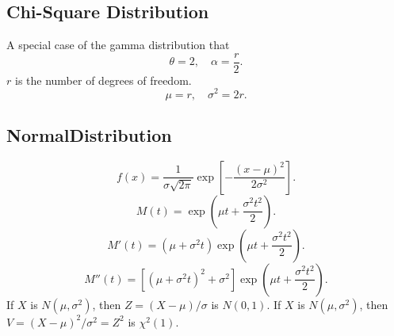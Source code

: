 \documentclass[10pt,landscape,a4paper]{article}
\begin{document}
\begin{multicols*}{5}
        \subsection*{Chi-Square Distribution}
        A special case of the gamma distribution that
        \[
                \theta = 2, \quad
                \alpha = \frac{r}{2}
        .\] 
        $r$ is the number of degrees of freedom.
        \[
                \mu = r, \quad \sigma^2 = 2r
        .\] 
        \subsection*{NormalDistribution}
        \[
                f(x) = \frac{1}{\sigma \sqrt{2 \pi}} 
                \exp [- \frac{(x-\mu)^2}{2 \sigma^2}]
        .\]
        \[
                M(t) = \exp \left( \mu t + \frac{\sigma^2 t^2}{2} \right)
        .\] 
        \[
                M'(t) = (\mu + \sigma^2 t) 
                \exp \left( \mu t + \frac{\sigma^2 t^2}{2} \right)
        .\]
        \[
                M''(t) = [(\mu + \sigma^2 t)^2 + \sigma^2] 
                \exp \left( \mu t + \frac{\sigma^2 t^2}{2} \right) 
        .\]
        If $X$ is  $N(\mu, \sigma^2)$,
        then $Z = (X-\mu) / \sigma$ is $N(0,1)$.
        If $X$ is  $N(\mu,\sigma^2)$,
        then $V = (X-\mu)^2 / \sigma^2 = Z^2$ is  $\chi^2(1)$.
\end{multicols*}
\end{document}
